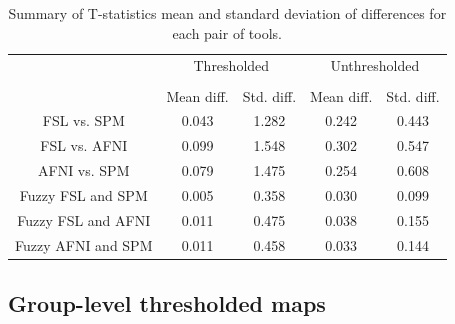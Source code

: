\documentclass[conference]{IEEEtran}
\begin{document}
\setlength{\tabcolsep}{5pt}
\begin{table}[h]
    \centering
    \begin{tabular}{ccc|cc}
        \toprule
        \multirow{2}{*}{} & \multicolumn{2}{c}{Thresholded} & \multicolumn{2}{c}{Unthresholded} \\
        \cmidrule{2-3} \cmidrule{4-5} \\
        {} & Mean diff. & Std. diff. & Mean diff. & Std. diff. \\
        \midrule
        \rowcolor{lightgray}
        FSL vs. SPM          &  0.043       & 1.282      & 0.242     & 0.443  \\
        \rowcolor{lightgray}
        FSL vs. AFNI         &  0.099       & 1.548      & 0.302     & 0.547  \\
        \rowcolor{lightgray}
        AFNI vs. SPM         &  0.079       & 1.475      & 0.254     & 0.608  \\
        Fuzzy FSL and SPM    &  0.005       & 0.358      & 0.030     & 0.099  \\
        Fuzzy FSL and AFNI   &  0.011       & 0.475      & 0.038     & 0.155  \\
        Fuzzy AFNI and SPM   &  0.011       & 0.458      & 0.033     & 0.144  \\
        \bottomrule
    \end{tabular}
    \caption{Summary of T-statistics mean and standard deviation of differences for each pair of tools.}
    \label{table:pipeline-stats}
\end{table}


\subsection{Group-level thresholded maps}
\end{document}
